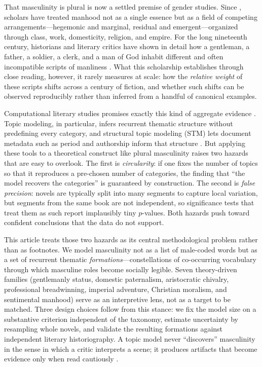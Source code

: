 \documentclass[11pt]{article}
\begin{document}
That masculinity is plural is now a settled premise of gender studies. Since
\citet{connell1995masculinities}, scholars have treated manhood not as a single
essence but as a field of competing arrangements---hegemonic and marginal,
residual and emergent---organized through class, work, domesticity, religion,
and empire. For the long nineteenth century, historians and literary critics
have shown in detail how a gentleman, a father, a soldier, a clerk, and a man of
God inhabit different and often incompatible scripts of manliness
\citep{tosh1999mans,davidoff1987family,sussman1995victorian,adams1995dandies,mallett2015victorian}.
What this scholarship establishes through close reading, however, it rarely
measures at scale: how the \emph{relative weight} of these scripts shifts across
a century of fiction, and whether such shifts can be observed reproducibly
rather than inferred from a handful of canonical examples.

Computational literary studies promises exactly this kind of aggregate evidence
\citep{moretti2000conjectures,jockers2013macroanalysis,underwood2019distant,piper2018enumerations,heuser2012quantitative}.
Topic modeling, in particular, infers recurrent thematic structure without
predefining every category, and structural topic modeling (STM) lets
document metadata such as period and authorship inform that structure
\citep{roberts2019stm}. But applying these tools to a theoretical construct like
plural masculinity raises two hazards that are easy to overlook. The first is
\emph{circularity}: if one fixes the number of topics so that it reproduces a
pre-chosen number of categories, the finding that ``the model recovers the
categories'' is guaranteed by construction. The second is \emph{false
precision}: novels are typically split into many segments to capture local
variation, but segments from the same book are not independent, so significance
tests that treat them as such report implausibly tiny $p$-values. Both hazards
push toward confident conclusions that the data do not support.

This article treats those two hazards as its central methodological problem
rather than as footnotes. We model masculinity not as a list of male-coded words
but as a set of recurrent thematic \emph{formations}---constellations of
co-occurring vocabulary through which masculine roles become socially legible.
Seven theory-driven families (gentlemanly status, domestic paternalism,
aristocratic chivalry, professional breadwinning, imperial adventure, Christian
moralism, and sentimental manhood) serve as an interpretive lens, not as a target
to be matched. Three design choices follow from this stance: we fix the model
size on a substantive criterion independent of the taxonomy, estimate uncertainty
by resampling whole novels, and validate the resulting formations against
independent literary historiography. A topic model never ``discovers''
masculinity in the sense in which a critic interprets a scene; it produces
artifacts that become evidence only when read cautiously
\citep{buurma2015fictionality}.
\end{document}
